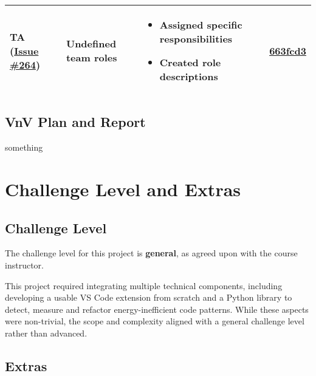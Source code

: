 \documentclass{article}
\begin{document}
\begin{longtable}{|p{2cm}|p{3.5cm}|p{4.5cm}|p{3cm}|}
    TA (\href{https://github.com/ssm-lab/capstone--source-code-optimizer/issues/264}{Issue \#264}) & 
    Undefined team roles &
    \begin{itemize}[nosep,leftmargin=*]
        \item Assigned specific responsibilities
        \item Created role descriptions
    \end{itemize} &
    \href{https://github.com/ssm-lab/capstone--source-code-optimizer/commit/663fcd3}{663fcd3} \\
    \hline
    
\end{longtable}

\subsection{VnV Plan and Report}
something

\section{Challenge Level and Extras}

\subsection{Challenge Level}


The challenge level for this project is \textbf{general}, as agreed upon with the course instructor.

\noindent This project required integrating multiple technical components, including developing a usable VS Code extension from scratch and a Python library to detect, measure and refactor energy-inefficient code patterns.
 While these aspects were non-trivial, the scope and complexity aligned with a general challenge level rather than advanced.

\subsection{Extras}

\end{document}
